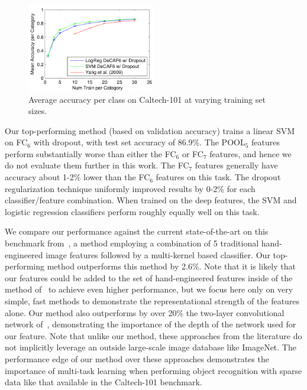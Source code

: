 \begin{figure}
  \centering
  \includegraphics[width=0.5\textwidth]{figs/decaf/caltech101_plot_numtrain.pdf}
  \caption{Average accuracy per class on Caltech-101 at varying training set sizes.}\label{fig:caltech101results}
\end{figure}

Our top-performing method (based on validation accuracy) trains a linear SVM on FC$_6$ with dropout, with test set accuracy of 86.9\%.
The POOL$_5$ features perform substantially worse than either the FC$_6$ or FC$_7$ features, and hence we do not evaluate them further in this work.
The FC$_7$ features generally have accuracy about 1-2\% lower than the FC$_6$ features on this task.
The dropout regularization technique uniformly improved results by 0-2\% for each classifier/feature combination.
When trained on the deep features, the SVM and logistic regression classifiers perform roughly equally well on this task.

We compare our performance against the current state-of-the-art on this benchmark from~\cite{yang09}, a method employing a combination of 5 traditional hand-engineered image features followed by a multi-kernel based classifier.
Our top-performing method outperforms this method by 2.6\%. Note that it is likely that our features could be added to the set of hand-engineered features inside of the method of~\cite{yang09} to achieve even higher performance, but we focus here only on very simple, fast methods to demonstrate the representational strength of the features alone.
Our method also outperforms by over 20\% the two-layer convolutional network of~\cite{jarrett09}, demonstrating the importance of the depth of the network used for our feature.
Note that unlike our method, these approaches from the literature do not implicitly leverage an outside large-scale image database like ImageNet.
The performance edge of our method over these approaches demonstrates the importance of multi-task learning when performing object recognition with sparse data like that available in the Caltech-101 benchmark.

